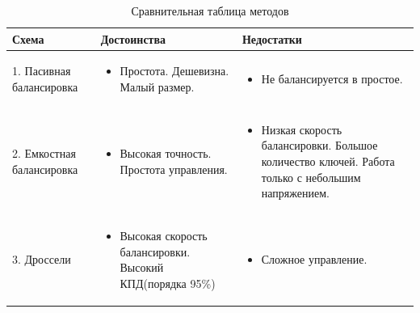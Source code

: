 
\begin{table}[h!]
    \renewcommand{\arraystretch}{1} %
    \setlength{\tabcolsep}{9pt}      %
    \fontsize{10    }{12}\selectfont       %
    \centering
    \caption{Сравнительная таблица методов}
    \label{tab:balancing_schemes}
    \begin{tabularx}{1.1\linewidth}{|X|X|X|}
        \hline
        \fontsize{12}{14}\selectfont\textbf{Схема} & \fontsize{12}{14}\selectfont\textbf{Достоинства} & \fontsize{12}{14}\selectfont\textbf{Недостатки} \\
        \hline

        1. Пасивная балансировка & 
        \begin{itemize}
            \item Простота. Дешевизна. Малый размер.
        \end{itemize} & 
        \begin{itemize}
            \item Не балансируется в простое. 
        \end{itemize} \\
        \hline

        2. Емкостная балансировка & 
        \begin{itemize}
            \item Высокая точность. Простота управления.
        \end{itemize} & 
        \begin{itemize}
            \item Низкая скорость балансировки. Большое количество ключей. Работа только с небольшим напряжением.
        \end{itemize} \\
        \hline
    
        3. Дроссели & 
        \begin{itemize}
            \item Высокая скорость балансировки. Высокий КПД(порядка 95\%)
        \end{itemize} & 
        \begin{itemize}
            \item Сложное управление. 
        \end{itemize} \\
        \hline


\end{tabularx}
\end{table}
